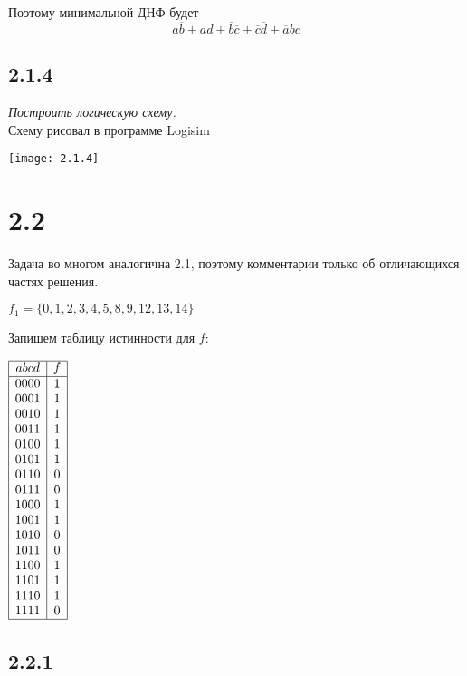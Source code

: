 \documentclass[a4paper,12pt]{article}
\begin{document}
Поэтому минимальной ДНФ будет
\[a\overline{b} + ad + \overline{b}\overline{c} + \overline{c}\overline{d} + \overline{a}bc\]




\subsection*{2.1.4}

\textit{Построить логическую схему.}
\\

Схему рисовал в программе Logisim

\texttt{[image: 2.1.4]}

\newpage




\section*{2.2}

Задача во многом аналогична 2.1, поэтому комментарии только об отличающихся частях решения.

$f_1 = \{0, 1, 2, 3, 4, 5, 8, 9, 12, 13, 14\}$

Запишем таблицу истинности для $f$:

\begin{center}
	$\begin{array}{| c | c |}
	\hline
	abcd & f \\
	\hline
	0000 & 1 \\
	0001 & 1 \\
	0010 & 1 \\
	0011 & 1 \\
	0100 & 1 \\
	0101 & 1 \\
	0110 & 0 \\
	0111 & 0 \\
	1000 & 1 \\
	1001 & 1 \\
	1010 & 0 \\
	1011 & 0 \\
	1100 & 1 \\
	1101 & 1 \\
	1110 & 1 \\
	1111 & 0 \\
	\hline
	\end{array}$
\end{center}




\subsection*{2.2.1}
\end{document}
